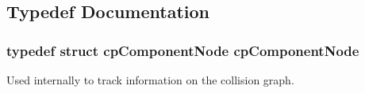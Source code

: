 \subsection{Typedef Documentation}
\hypertarget{group__cp_body_gafd1d958a322b86c54e6b0a7109e4b0b9}{
\subsubsection[{cp\-Component\-Node}]{\setlength{\rightskip}{0pt plus 5cm}typedef struct {\bf cp\-Component\-Node}  {\bf cp\-Component\-Node}}}\label{group__cp_body_gafd1d958a322b86c54e6b0a7109e4b0b9}
Used internally to track information on the collision graph. 